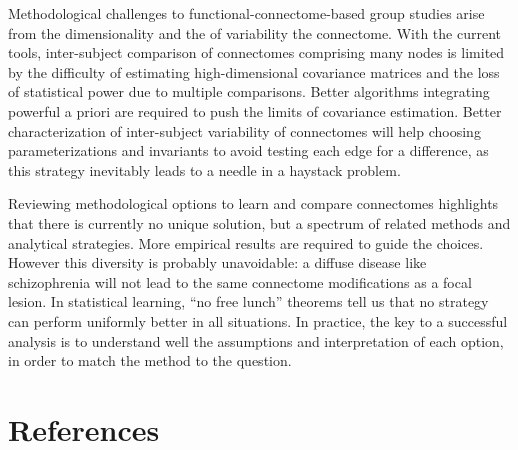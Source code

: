 \documentclass[5p]{elsarticle}
\begin{document}
Methodological challenges to functional-connectome-based group studies
arise from the dimensionality and the of variability the connectome. With
the current tools, inter-subject comparison of connectomes comprising
many nodes is limited by the difficulty of estimating high-dimensional
covariance matrices and the loss of statistical power due to multiple
comparisons. Better algorithms integrating powerful a priori are required
to push the limits of covariance estimation. Better characterization of
inter-subject variability of connectomes \cite{kelly2012} will help
choosing parameterizations and invariants to avoid testing each edge for
a difference, as this strategy inevitably leads to a needle in a haystack
problem.

Reviewing methodological options to learn and compare connectomes
highlights that there is currently no unique solution, but a spectrum of
related methods and analytical strategies. More empirical results are
required to guide the choices. However this diversity is probably
unavoidable: a diffuse disease like schizophrenia will not lead to the
same connectome modifications as a focal lesion. In statistical learning,
``no free lunch'' theorems \cite{wolpert1996} tell us that no strategy
can perform uniformly better in all situations. In practice, the key to a
successful analysis is to understand well the assumptions and
interpretation of each option, in order to match the method to the
question.

{
\section*{References} \small 
 }

\end{document}
